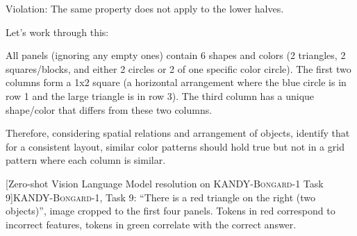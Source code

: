 \begin{tcolorbox}[breakable,enhanced jigsaw,opacityback=0,]
\begin{dialogue}
		Violation: The same property does not apply to the lower halves.
		
		Let's work through this:
		
		All panels (ignoring any empty ones) contain 6 shapes and colors (2 triangles, 2 squares/blocks, and either 2 circles or 2 of one specific color circle).
		The first two columns form a 1x2 square (a horizontal arrangement where the blue circle is in row 1 and the large triangle is in row 3). The third column has a unique shape/color that differs from these two columns.
		
		Therefore, considering spatial relations and arrangement of objects, identify that for a consistent layout, similar color patterns should hold true but not in a grid pattern where each column is similar.
	\end{dialogue}
\end{tcolorbox}
\noindent\begin{minipage}{\textwidth}
	[Zero-shot Vision Language Model resolution on \textsc{KANDY-Bongard-1} Task 9]{\textsc{KANDY-Bongard-1},  Task 9: ``There is a red triangle on the right (two objects)'', image cropped to the first four panels. Tokens in red correspond to incorrect features, tokens in green correlate with the correct answer.}\label{kandy:fig:task9-bongard}
\end{minipage}